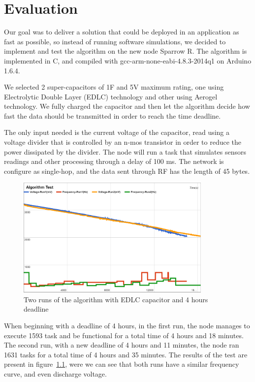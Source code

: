 \normalfont\normalsize
\chapter{Evaluation}

Our goal was to deliver a solution that could be deployed in an application as fast as possible, so
instead of running software simulations, we decided to implement and test the algorithm on the new
node Sparrow R. The algorithm is implemented in C, and compiled with gcc-arm-none-eabi-4.8.3-2014q1 on Arduino 1.6.4.

We selected 2 super-capacitors of 1F and 5V maximum rating, one using Electrolytic Double
Layer (EDLC) technology and other using Aerogel technology. We fully charged the capacitor and then
let the algorithm decide how fast the data should be transmitted in order to reach the time
deadline.

The only input needed is the current voltage of the capacitor, read using a voltage divider that is
controlled by an n-mos transistor in order to reduce the power dissipated by the divider. The node
will run a task that simulates sensors readings and other processing through a delay of 100 ms. The
network is configure as single-hop, and the data sent through RF has the length of 45 bytes.

\begin{figure}[ht] \centering
\includegraphics[width=0.85\textwidth]{img/algtest.png}
\caption{Two runs of the algorithm with EDLC capacitor and 4 hours deadline}
\label{fig:test4h}
\end{figure}

When beginning with a deadline of 4 hours, in the first run, the node manages to execute 1593 task and be
functional for a total time of 4 hours and 18 minutes. The second run, with a new deadline of 4
hours and 11 minutes, the node ran 1631 tasks for a total time of 4 hours and 35 minutes. The
results of the test are present in figure~\ref{fig:test4h}, were we can see that both runs have a
similar frequency curve, and even discharge voltage.

